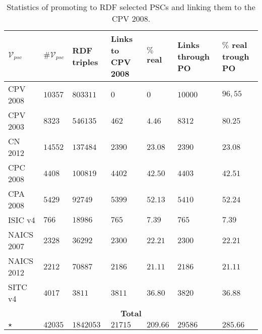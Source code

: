 \begin{table}[!htb]
\renewcommand{\arraystretch}{1.3}
\begin{center}
\begin{tabular}[c]{|p{2.2cm}|p{1.6cm}|p{1.8cm}|p{1.6cm}|p{1.6cm}|p{1.8cm}|p{1.6cm}|}
 
 \hline
  $\mathcal{V}_{psc}$ & $\#\mathcal{V}_{psc}$  & RDF triples &Links to CPV 2008 &  $\%$ real & Links through PO & $\%$ real trough PO    \\\hline

CPV 2008 	& $10357$  	& $803311$	& $0$	 	& $0$	 	& $10000$	& $96,55$	  \\ \hline
CPV 2003 	& $8323$  	& $546135$	& $462$ 	& $4.46$ 	& $8312$	& $80.25$	 \\ \hline
CN 2012  	& $14552$	& $137484$	& $2390$ 	& $23.08$	& $2390$	& $23.08$	  \\ \hline
CPC 2008 	& $4408$	& $100819$   	& $4402$	& $42.50$	& $4403$	& $42.51$ 	  \\ \hline
CPA 2008 	& $5429$	& $92749$   	& $5399$	& $52.13$	& $5410$	& $52.24$	  \\ \hline
ISIC v4  	& $766$		& $18986$   	& $765$ 	& $7.39$ 	& $765$		& $7.39$	   \\ \hline
NAICS 2007 	& $2328$	& $36292$ 	& $2300$	& $22.21$	& $2300$	& $22.21$	 \\ \hline
NAICS 2012 	& $2212$	& $70887$ 	& $2186$	& $21.11$	& $2186$	& $21.11$	  \\ \hline
SITC v4 	& $4017$	& $3811$   	& $3811$	& $36.80$	& $3820$	& $36.88$	 \\ \hline
\multicolumn{7}{|c|}{\textbf{Total}} \\ \hline
$\star$ 	& $42035$ 	& $1842053$	& $21715$   	& $209.66$	& $29586$ 	& $285.66$	 \\ \hline
\hline
  \end{tabular}
  \caption{Statistics of promoting to RDF selected PSCs and linking them to the CPV 2008.}\label{ganancia-terminos}  
  
  \end{center}
\end{table}



